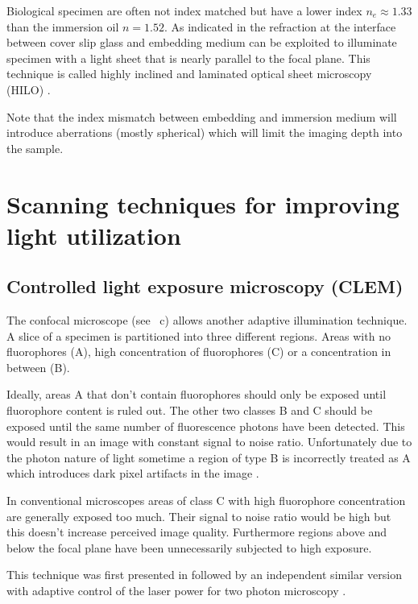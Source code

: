 Biological specimen are often not index matched but have a lower index
$n_e\approx 1.33$ than the immersion oil $n=1.52$. As indicated in
 the refraction at the interface between cover slip
glass and embedding medium can be exploited to illuminate specimen
with a light sheet that is nearly parallel to the focal plane.  This
technique is called highly inclined and laminated optical sheet
microscopy (HILO) \citep{Tokunaga2008, Konopka2008}.


Note that the index mismatch between embedding and immersion medium
will introduce aberrations (mostly spherical) which will limit the
imaging depth into the sample.
\section{Scanning techniques for improving light utilization}
\subsection{Controlled light exposure microscopy (CLEM)}
\label{sec:CLEM}
The confocal microscope (see ~c)
allows another adaptive illumination technique. A slice of a specimen
is partitioned into three different regions. Areas with no
fluorophores (A), high concentration of fluorophores (C) or a
concentration in between (B).

Ideally, areas A that don't contain fluorophores should only be
exposed until fluorophore content is ruled out. The other two classes
B and C should be exposed until the same number of fluorescence
photons have been detected. This would result in an image with
constant signal to noise ratio. Unfortunately due to the photon nature
of light sometime a region of type B is incorrectly treated as A which
introduces dark pixel artifacts in the image
\citep{Hoebe2010}.

In conventional microscopes areas of class C with high fluorophore
concentration are generally exposed too much. Their signal to
noise ratio would be high but this doesn't increase perceived image
quality. Furthermore regions above and below the focal plane have been
unnecessarily subjected to high exposure.


This technique was first presented in \citep{Hoebe2007}  followed by an independent similar version with adaptive
control of the laser power for two photon microscopy
\citep{Chu2007}. 

